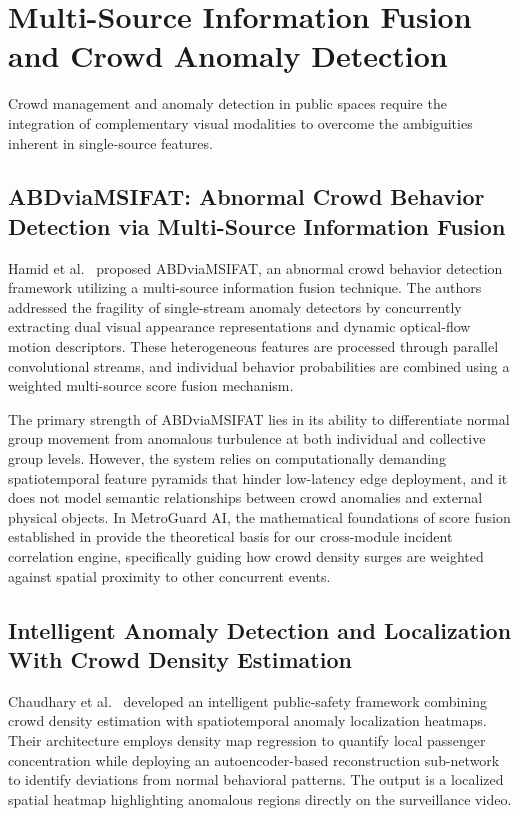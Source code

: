 \documentclass[12pt,a4paper]{report}
\begin{document}
\section{Multi-Source Information Fusion and Crowd Anomaly Detection}
Crowd management and anomaly detection in public spaces require the integration of complementary visual modalities to overcome the ambiguities inherent in single-source features.

\subsection{ABDviaMSIFAT: Abnormal Crowd Behavior Detection via Multi-Source Information Fusion}
Hamid et al.\ \cite{p1} proposed ABDviaMSIFAT, an abnormal crowd behavior detection framework utilizing a multi-source information fusion technique. The authors addressed the fragility of single-stream anomaly detectors by concurrently extracting dual visual appearance representations and dynamic optical-flow motion descriptors. These heterogeneous features are processed through parallel convolutional streams, and individual behavior probabilities are combined using a weighted multi-source score fusion mechanism.

The primary strength of ABDviaMSIFAT lies in its ability to differentiate normal group movement from anomalous turbulence at both individual and collective group levels. However, the system relies on computationally demanding spatiotemporal feature pyramids that hinder low-latency edge deployment, and it does not model semantic relationships between crowd anomalies and external physical objects. In MetroGuard AI, the mathematical foundations of score fusion established in \cite{p1} provide the theoretical basis for our cross-module incident correlation engine, specifically guiding how crowd density surges are weighted against spatial proximity to other concurrent events.

\subsection{Intelligent Anomaly Detection and Localization With Crowd Density Estimation}
Chaudhary et al.\ \cite{p2} developed an intelligent public-safety framework combining crowd density estimation with spatiotemporal anomaly localization heatmaps. Their architecture employs density map regression to quantify local passenger concentration while deploying an autoencoder-based reconstruction sub-network to identify deviations from normal behavioral patterns. The output is a localized spatial heatmap highlighting anomalous regions directly on the surveillance video.
\end{document}
